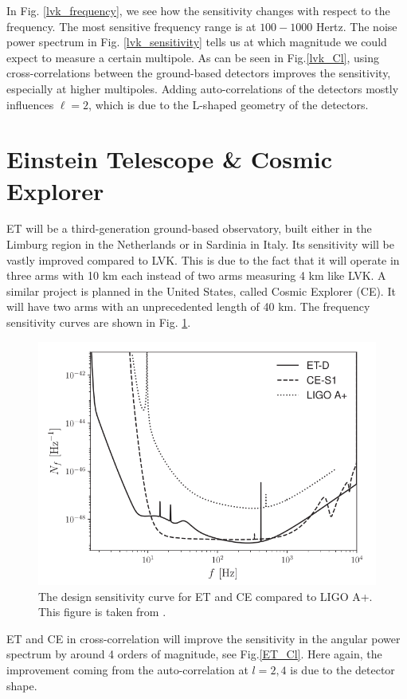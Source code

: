 In Fig. \ref{lvk_frequency}, we see how the sensitivity changes with respect to the frequency. The most sensitive frequency range is at $100 -1000$ Hertz.
The noise power spectrum in Fig. \ref{lvk_sensitivity} tells us at which magnitude we could expect to measure a certain multipole.
As can be seen in Fig.\ref{lvk_Cl}, using cross-correlations between the ground-based detectors improves the sensitivity, especially at higher multipoles. Adding auto-correlations of the detectors mostly influences $\ell=2$, which is due to the L-shaped geometry of the detectors. 

\section{Einstein Telescope \& Cosmic Explorer}

ET will be a third-generation ground-based observatory, built either in the Limburg region in the Netherlands or in Sardinia in Italy. Its sensitivity will be vastly improved compared to LVK. This is due to the fact that it will operate in three arms with 10 km each instead of two arms measuring 4 km like LVK. A similar project is planned in the United States, called Cosmic Explorer (CE). It will have two arms with an unprecedented length of 40 km. The frequency sensitivity curves are shown in Fig. \ref{ET_sensitivity}.

\label{ET_CE}
\begin{figure}[h]
    \centering
    \includegraphics[width=0.7\linewidth]{Images/ET_CE_frequency_noise.png}
    \caption[The design sensitivity curve for ET and CE compared to LIGO A+.]{The design sensitivity curve for ET and CE compared to LIGO A+. This figure is taken from \cite{alonso_noise_2020}.}
    \label{ET_sensitivity}
\end{figure} 

ET and CE in cross-correlation will improve the sensitivity in the angular power spectrum by around 4 orders of magnitude, see Fig.\ref{ET_Cl}.  Here again, the improvement coming from the auto-correlation at $l=2, 4$ is due to the detector shape.

